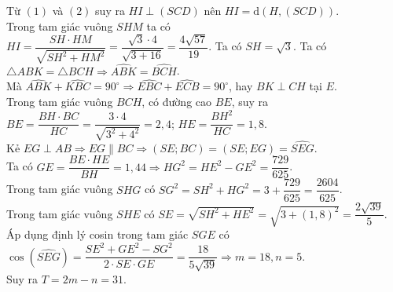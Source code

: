 \begin{ex}
{\begin{itemchoice}
	 Từ $(1)$ và $(2)$ suy ra $HI\perp (SCD)$ nên $HI=\mathrm{d}(H,(SCD))$.\\
	 Trong tam giác vuông $SHM$ ta có\\
	  $HI = \dfrac{SH \cdot HM}{\sqrt{SH^2+HM^2}} = \dfrac{\sqrt{3} \cdot 4}{\sqrt{3+16}} = \dfrac{4\sqrt{57}}{19}$.
	\itemch Ta có $SH = \sqrt{3}$.
	\itemch Ta có $\triangle ABK=\triangle BCH\Rightarrow \widehat{ABK}=\widehat{BCH}$.\\
Mà $\widehat{ABK}+\widehat{KBC}=90^\circ\Rightarrow \widehat{EBC}+\widehat{ECB}=90^\circ$, hay $BK\perp CH$ tại $E$.\\
Trong tam giác vuông $BCH$, có đường cao $BE$, suy ra\\
 $BE=\dfrac{BH\cdot BC}{HC}=\dfrac{3\cdot4}{\sqrt{3^2+4^2}}=2{,}4$;
$HE=\dfrac{BH^2}{HC}=1{,}8$.\\
Kẻ $EG\perp AB\Rightarrow EG\parallel BC\Rightarrow(SE;BC)=(SE;EG)=\widehat{SEG}$.\\
Ta có $GE=\dfrac{BE\cdot HE}{BH}=1{,}44\Rightarrow HG^2=HE^2-GE^2=\dfrac{729}{625}$.\\
Trong tam giác vuông $SHG$ có $SG^2=SH^2+HG^2=3+\dfrac{729}{625}=\dfrac{2604}{625}$.\\
Trong tam giác vuông $SHE$ có $SE=\sqrt{SH^2+HE^2}=\sqrt{3+(1{,}8)^2}=\dfrac{2\sqrt{39}}{5}$.\\
Áp dụng định lý cosin trong tam giác $SGE$ có\\
$\cos(\widehat{SEG})=\dfrac{SE^2+GE^2-SG^2}{2\cdot SE\cdot GE}=\dfrac{18}{5\sqrt{39}}\Rightarrow m=18,n=5$.\\
Suy ra $T=2m-n=31$.
	\end{itemchoice}
    }
\end{ex}

